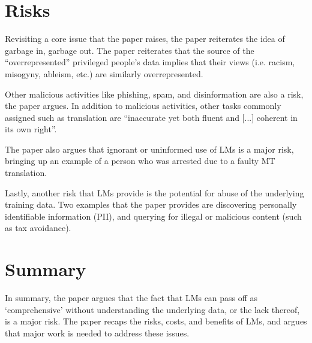 \documentclass[12pt]{article}
\begin{document}
\section*{Risks}
Revisiting a core issue that the paper raises, the paper reiterates the idea of
garbage in, garbage out. The paper reiterates that the source of the
``overrepresented'' privileged people's data implies that their views (i.e.
racism, misogyny, ableism, etc.) are similarly overrepresented.

Other malicious activities like phishing, spam, and disinformation are also a
risk, the paper argues. In addition to malicious activities, other tasks
commonly assigned such as translation are ``inaccurate yet
both fluent and [...] coherent in its own right''.

The paper also argues that ignorant or uninformed use of LMs is a major risk,
bringing up an example of a person who was arrested due to a faulty MT
translation.

Lastly, another risk that LMs provide is the potential for abuse of the
underlying training data. Two examples that the paper provides are discovering
personally identifiable information (PII), and querying for illegal or malicious
content (such as tax avoidance).

\section*{Summary}
In summary, the paper argues that the fact that LMs can pass off as `comprehensive'
without understanding the underlying data, or the lack thereof, is a major risk.
The paper recaps the risks, costs, and benefits of LMs, and argues that major
work is needed to address these issues.
\end{document}
